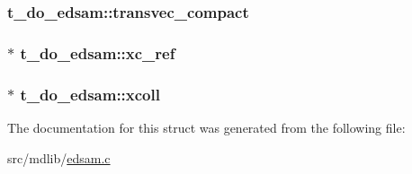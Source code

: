 \hypertarget{structt__do__edsam_a73692e5311bbac0f5b73df69543d2e58}{
\subsubsection[{transvec\-\_\-compact}]{ {\bf t\-\_\-do\-\_\-edsam\-::transvec\-\_\-compact}}}\label{structt__do__edsam_a73692e5311bbac0f5b73df69543d2e58}
\hypertarget{structt__do__edsam_a3ad6ddaf291b3fc78be729dc4a52a29f}{
\subsubsection[{xc\-\_\-ref}]{$\ast$ {\bf t\-\_\-do\-\_\-edsam\-::xc\-\_\-ref}}}\label{structt__do__edsam_a3ad6ddaf291b3fc78be729dc4a52a29f}
\hypertarget{structt__do__edsam_aed23639ff7646d73032b14bf2166b660}{
\subsubsection[{xcoll}]{$\ast$ {\bf t\-\_\-do\-\_\-edsam\-::xcoll}}}\label{structt__do__edsam_aed23639ff7646d73032b14bf2166b660}


\-The documentation for this struct was generated from the following file\-:\begin{DoxyCompactItemize}
\item 
src/mdlib/\hyperlink{edsam_8c}{edsam.\-c}\end{DoxyCompactItemize}
